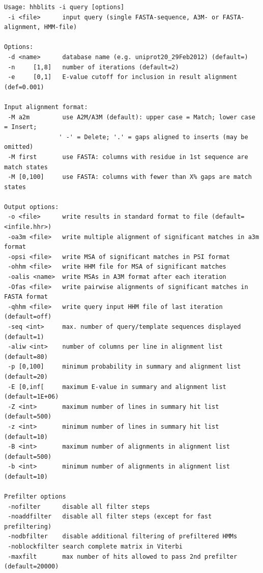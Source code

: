 \documentclass[11pt,a4paper]{article}
\begin{document}
\small 
\begin{verbatim}
Usage: hhblits -i query [options] 
 -i <file>      input query (single FASTA-sequence, A3M- or FASTA-alignment, HMM-file)

Options:                                                                       
 -d <name>      database name (e.g. uniprot20_29Feb2012) (default=)          
 -n     [1,8]   number of iterations (default=2)                              
 -e     [0,1]   E-value cutoff for inclusion in result alignment (def=0.001)      

Input alignment format:                                                       
 -M a2m         use A2M/A3M (default): upper case = Match; lower case = Insert;
               ' -' = Delete; '.' = gaps aligned to inserts (may be omitted)   
 -M first       use FASTA: columns with residue in 1st sequence are match states
 -M [0,100]     use FASTA: columns with fewer than X% gaps are match states   

Output options: 
 -o <file>      write results in standard format to file (default=<infile.hhr>)
 -oa3m <file>   write multiple alignment of significant matches in a3m format
 -opsi <file>   write MSA of significant matches in PSI format
 -ohhm <file>   write HHM file for MSA of significant matches
 -oalis <name>  write MSAs in A3M format after each iteration
 -Ofas <file>   write pairwise alignments of significant matches in FASTA format
 -qhhm <file>   write query input HHM file of last iteration (default=off)      
 -seq <int>     max. number of query/template sequences displayed (default=1)  
 -aliw <int>    number of columns per line in alignment list (default=80)       
 -p [0,100]     minimum probability in summary and alignment list (default=20)  
 -E [0,inf[     maximum E-value in summary and alignment list (default=1E+06)      
 -Z <int>       maximum number of lines in summary hit list (default=500)        
 -z <int>       minimum number of lines in summary hit list (default=10)        
 -B <int>       maximum number of alignments in alignment list (default=500)     
 -b <int>       minimum number of alignments in alignment list (default=10)     

Prefilter options                                                               
 -nofilter      disable all filter steps                                        
 -noaddfilter   disable all filter steps (except for fast prefiltering)         
 -nodbfilter    disable additional filtering of prefiltered HMMs                
 -noblockfilter search complete matrix in Viterbi                               
 -maxfilt       max number of hits allowed to pass 2nd prefilter (default=20000)  


\end{verbatim}
\end{document}
